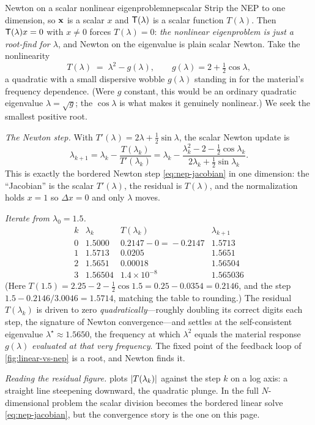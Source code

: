 \begin{workedexample}{Newton on a scalar nonlinear eigenproblem}{nepscalar}
Strip the NEP to one dimension, so $\mathbf{x}$ is a scalar $x$ and $\mathsf{T}(\lambda)$ is
a scalar function $T(\lambda)$. Then $\mathsf{T}(\lambda)x=0$ with $x\neq0$ forces
$T(\lambda)=0$: \emph{the nonlinear eigenproblem is just a root-find for
$\lambda$}, and Newton on the eigenvalue is plain scalar Newton. Take the
nonlinearity
\[
  T(\lambda) \;=\; \lambda^2 - g(\lambda),
  \qquad g(\lambda) = 2 + \tfrac{1}{2}\cos\lambda,
\]
a quadratic with a small dispersive wobble $g(\lambda)$ standing in for the
material's frequency dependence. (Were $g$ constant, this would be an ordinary
quadratic eigenvalue $\lambda=\sqrt g$; the $\cos\lambda$ is what makes it
genuinely nonlinear.) We seek the smallest positive root.

\smallskip
\emph{The Newton step.} With $T'(\lambda)=2\lambda+\tfrac12\sin\lambda$, the scalar
Newton update is
\[
  \lambda_{k+1} = \lambda_k - \frac{T(\lambda_k)}{T'(\lambda_k)}
    = \lambda_k - \frac{\lambda_k^2 - 2 - \tfrac12\cos\lambda_k}
                       {2\lambda_k + \tfrac12\sin\lambda_k}.
\]
This is exactly the bordered Newton step \cref{eq:nep-jacobian} in one dimension:
the ``Jacobian'' is the scalar $T'(\lambda)$, the residual is $T(\lambda)$, and
the normalization holds $x=1$ so $\Delta x=0$ and only $\lambda$ moves.

\smallskip
\emph{Iterate from $\lambda_0=1.5$.}
\[
  \begin{array}{c|ccc}
    k & \lambda_k & T(\lambda_k) & \lambda_{k+1} \\\hline
    0 & 1.5000 & 0.2147 - 0\!=\!-0.2147 & 1.5713 \\
    1 & 1.5713 & 0.0205 & 1.5651 \\
    2 & 1.5651 & 0.00018 & 1.56504 \\
    3 & 1.56504 & 1.4\!\times\!10^{-8} & 1.565036
  \end{array}
\]
(Here $T(1.5)=2.25-2-\tfrac12\cos1.5=0.25-0.0354=0.2146$, and the step
$1.5-0.2146/3.0046=1.5714$, matching the table to rounding.) The residual
$T(\lambda_k)$ is driven to zero \emph{quadratically}---roughly doubling its
correct digits each step, the signature of Newton convergence---and settles at the
self-consistent eigenvalue $\lambda^\star\approx1.5650$, the frequency at which
$\lambda^2$ equals the material response $g(\lambda)$ \emph{evaluated at that very
frequency}. The fixed point of the feedback loop of \cref{fig:linear-vs-nep} is a
root, and Newton finds it.

\smallskip
\emph{Reading the residual figure.}  plots
$\lvert T(\lambda_k)\rvert$ against the step $k$ on a log axis: a straight line
steepening downward, the quadratic plunge. In the full $N$-dimensional problem the
scalar division becomes the bordered linear solve \cref{eq:nep-jacobian}, but the
convergence story is the one on this page.
\end{workedexample}


